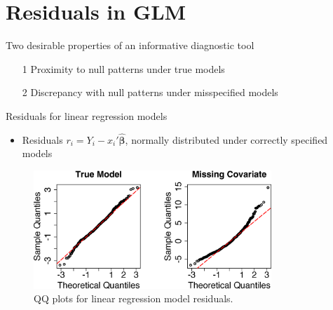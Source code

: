 \documentclass[
  ignorenonframetext,
]{beamer}
\begin{document}
\hypertarget{residuals-in-glm}{%
\section{Residuals in GLM}\label{residuals-in-glm}}

\begin{frame}{Two desirable properties of an informative diagnostic
tool}
\protect\hypertarget{two-desirable-properties-of-an-informative-diagnostic-tool}{}
\begin{itemize}
        \vspace{0.1in}
        \item[1] Proximity to null patterns under true models
        \vspace{0.2in}
        \item[2] Discrepancy with null patterns under misspecified models
\end{itemize}
\end{frame}

\begin{frame}{Residuals for linear regression models}
\protect\hypertarget{residuals-for-linear-regression-models}{}
\begin{itemize}
    \item Residuals $r_i=Y_i-x_i'\hat{\bm\beta}$, normally distributed under correctly specified models
\end{itemize}

\begin{figure}[h]
    \centering
    \includegraphics[width=0.8\textwidth]{figures/lmexam}
    \caption{QQ plots for linear regression model residuals.}
\end{figure}
\end{frame}
\end{document}
